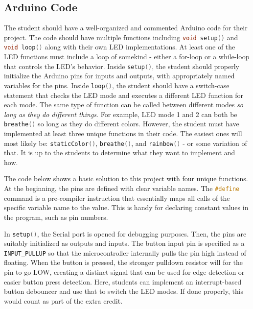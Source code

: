 \documentclass{article}
\begin{document}
    \subsection*{Arduino Code}

    The student should have a well-organized and commented Arduino code for their project. 
    The code should have multiple functions including \lstinline[language=C++, style=mystyle]{void setup()} and \lstinline[language=C++, style=mystyle]{void loop()} along with their own LED implementations. 
    At least one of the LED functions must include a loop of somekind - either a for-loop or a while-loop that controls the LED's behavior.
    Inside \lstinline[language=C++, style=mystyle]{setup()}, the student should properly initialize the Arduino pins for inputs and outputs, with appropriately named variables for the pins. 
    Inside \lstinline[language=C++, style=mystyle]{loop()}, the student should have a switch-case statement that checks the LED mode and executes a different LED function for each mode.
    The same type of function can be called between different modes \emph{so long as they do different things}. 
    For example, LED mode 1 and 2 can both be \lstinline[language=C++, style=mystyle]{breathe()} so long as they do different colors.
    However, the student must have implemented at least three unique functions in their code.
    The easiest ones will most likely be: \lstinline[language=C++, style=mystyle]{staticColor()}, \lstinline[language=C++, style=mystyle]{breathe()}, and \lstinline[language=C++, style=mystyle]{rainbow()} - or some variation of that.
    It is up to the students to determine what they want to implement and how.

    The code below shows a basic solution to this project with four unique functions. 
    At the beginning, the pins are defined with clear variable names.
    The \lstinline[language=C++, style=mystyle]{#define} command is a pre-compiler instruction that essentially maps all calls of the specific variable name to the value.
    This is handy for declaring constant values in the program, such as pin numbers.

    In \lstinline[language=C++, style=mystyle]{setup()}, the Serial port is opened for debugging purposes.
    Then, the pins are suitably initialized as outputs and inputs.
    The button input pin is specified as a \lstinline[language=C++, style=mystyle]{INPUT_PULLUP} so that the microcontroller internally pulls the pin high instead of floating.
    When the button is pressed, the stronger pulldown resistor will for the pin to go LOW, creating a distinct signal that can be used for edge detection or easier button press detection.
    Here, students can implement an interrupt-based button debouncer and use that to switch the LED modes.
    If done properly, this would count as part of the extra credit.
    
\end{document}
